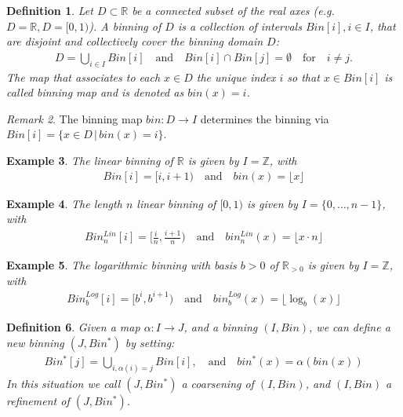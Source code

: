 \documentclass{article}
\theoremstyle{plain}
\newtheorem{definition}{Definition}[section]
\newtheorem{example}[definition]{Example}
\theoremstyle{remark}
\newtheorem{remark}[definition]{Remark}
\newcommand{\IR}{\mathbb{R}}
\newcommand{\IZ}{\mathbb{Z}}
\newcommand{\Union}{\bigcup}
\newcommand{\qtext}[1]{\quad\text{#1}\quad} %
\newcommand{\ra}{\rightarrow}
\newcommand{\floor}[1]{\lfloor#1\rfloor}
\begin{document}
\begin{definition}
  Let $D \subset \IR$ be a connected subset of the real axes (e.g. $D=\IR, D=[0,1)$).
  A binning of $D$ is a collection of intervals $Bin[i], i \in I$, that are disjoint and collectively cover the binning domain $D$:
  \begin{align*}
    D = \Union_{i\in I} Bin[i] \qtext{and} Bin[i] \cap Bin[j] = \emptyset \qtext{for} i \neq j.
  \end{align*}
  The map that associates to each $x \in D$ the unique index $i$ so that $x \in Bin[i]$ is called
  binning map and is denoted as $bin(x) = i$.
\end{definition}

\begin{remark}
  The binning map $bin: D \ra I$ determines the binning via $Bin[i] = \{ x \in D \,|\, bin(x) = i \}$.
\end{remark}

\begin{example}
  The linear binning of $\IR$ is given by $I = \IZ$, with
  \begin{align*}
    Bin[i] = [i, i+1)  \qtext{and} bin(x)=\floor{x}
  \end{align*}
\end{example}

\begin{example}
  The length $n$ linear binning of $[0,1)$ is given by $I = \{0, \dots, n-1\}$, with
    \begin{align*}
      Bin^{Lin}_n[i]   = [ \frac{i}{n}, \frac{i+1}{n} )
      \qtext{and}
      bin^{Lin}_n(x) = \floor{x \cdot n}
    \end{align*}
\end{example}

\begin{example}
  The logarithmic binning with basis $b > 0$ of $\IR_{>0}$ is given by $I=\IZ$, with
  \begin{align*}
    Bin^{Log}_b[i] = [b^i, b^{i+1})
    \qtext{and}
    bin^{Log}_b(x)=\floor{\log_b(x)}
  \end{align*}
\end{example}

\begin{definition}\label{ref}
  Given a map $\alpha: I \ra J$, and a binning $(I, Bin)$, we can define a new binning
  $(J, Bin^*)$ by setting:
  \begin{align*}
    Bin^*[j] = \Union_{i, \alpha(i) = j} Bin[i], \qtext{and} bin^*(x) = \alpha(bin(x))
  \end{align*}
  In this situation we call $(J, Bin^*)$ a coarsening of $(I, Bin)$, and $(I, Bin)$ a refinement of $(J, Bin^*)$.
\end{definition}
\end{document}
